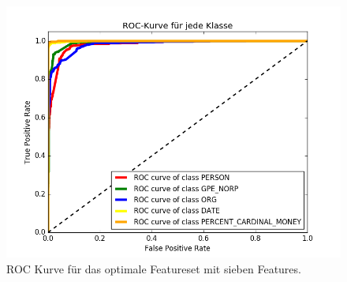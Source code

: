 \documentclass[bibliography=totoc]{scrartcl}
\begin{document}
\begin{appendices}
		\begin{figure}[H]
			\centering
			\includegraphics[scale=0.5]{roc_curve.png}
			\caption{ROC Kurve für das optimale Featureset mit sieben Features.}
			\label{tab:roc}
		\end{figure}
		

		
	\end{appendices}
		
\end{document}
